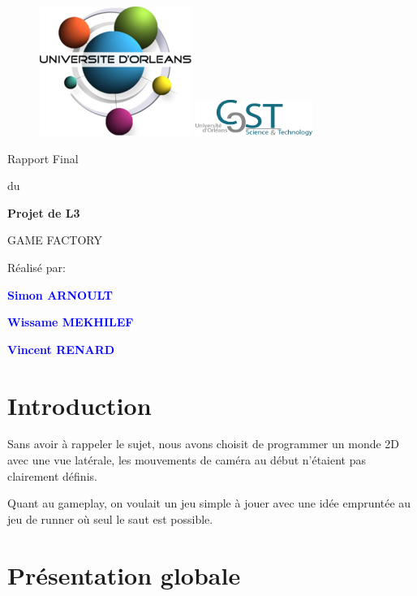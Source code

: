 \documentclass[french,12pt]{article}
\newcommand{\ml}[0]{\par\noindent}
\begin{document}
\thispagestyle{empty}
%
\begin{figure}[H]
\includegraphics[width=0.2\linewidth]{logo_univ.png}
\hfill
\includegraphics[width=1.5in]{logo_ufr.png}
\end{figure}
\vspace{2cm}
%
\begin{center}
{\Huge Rapport Final}
\par\vspace{0.4cm}
{\Large du}
\par\vspace{0.4cm}
{\Huge\bf Projet de L3}
\par\vspace{3cm}
{\Huge       GAME FACTORY}
\par\vspace{3cm}
{\Huge       Réalisé par:}

\par\vspace{0.7cm}
{\Huge\bf \textcolor{blue}{Simon ARNOULT}}
\par\vspace{0.3cm}
{\Huge\bf \textcolor{blue}{Wissame MEKHILEF}}
\par\vspace{0.3cm}
{\Huge\bf \textcolor{blue}{Vincent RENARD}}

\end{center}
\newpage
\tableofcontents
\newpage


\section{Introduction}

Sans avoir à rappeler le sujet, nous avons choisit de programmer un monde 2D avec une vue latérale, les mouvements de caméra au début n'étaient pas clairement définis.
\ml
Quant au gameplay, on voulait un jeu simple à jouer avec une idée empruntée au jeu de runner où seul le saut est possible.

\section{Présentation globale}

\end{document}

